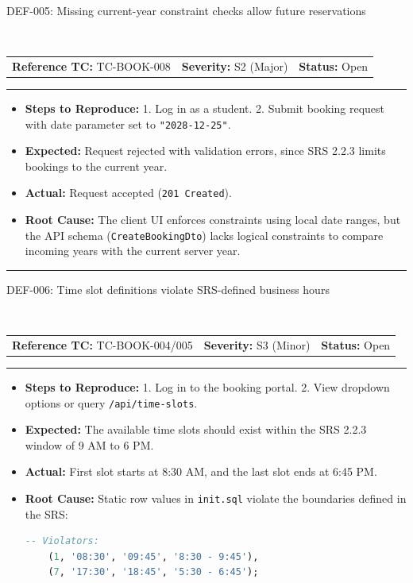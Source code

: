 \documentclass[11pt,a4paper]{article}
\makeatletter
\newcommand{\defectheader}[5]{%
    \needspace{6\baselineskip}
    \noindent\colorbox{primaryblue}{\parbox{\dimexpr\textwidth-2\fboxsep\relax}{
        \color{white}\bfseries\large\strut #1: #2
    }}
    \nopagebreak\\
    \noindent\begin{tabularx}{\textwidth}{@{}X X X@{}}
        \textbf{Reference TC:} #3 & \textbf{Severity:} #4 & \textbf{Status:} #5 \\
    \end{tabularx}
    \nopagebreak\vspace{0.1cm}
    \nopagebreak\hrule\vspace{0.2cm}
}
\makeatother
\begin{document}
\defectheader{DEF-005}{Missing current-year constraint checks allow future reservations}{TC-BOOK-008}{S2 (Major)}{Open}
\begin{itemize}[noitemsep,topsep=1pt,leftmargin=0.5cm]
    \item \textbf{Steps to Reproduce:} 
    1. Log in as a student. 2. Submit booking request with date parameter set to \texttt{"2028-12-25"}.
    \item \textbf{Expected:} Request rejected with validation errors, since SRS 2.2.3 limits bookings to the current year.
    \item \textbf{Actual:} Request accepted (\texttt{201 Created}).
    \item \textbf{Root Cause:} The client UI enforces constraints using local date ranges, but the API schema (\texttt{CreateBookingDto}) lacks logical constraints to compare incoming years with the current server year.
\end{itemize}

\vspace{0.4cm}\hrule\vspace{0.4cm}

\defectheader{DEF-006}{Time slot definitions violate SRS-defined business hours}{TC-BOOK-004/005}{S3 (Minor)}{Open}
\begin{itemize}[noitemsep,topsep=1pt,leftmargin=0.5cm]
    \item \textbf{Steps to Reproduce:} 
    1. Log in to the booking portal. 2. View dropdown options or query \texttt{/api/time-slots}.
    \item \textbf{Expected:} The available time slots should exist within the SRS 2.2.3 window of 9 AM to 6 PM.
    \item \textbf{Actual:} First slot starts at 8:30 AM, and the last slot ends at 6:45 PM.
    \item \textbf{Root Cause:} Static row values in \texttt{init.sql} violate the boundaries defined in the SRS:
    \begin{lstlisting}[language=SQL]
    -- Violators:
    (1, '08:30', '09:45', '8:30 - 9:45'),
    (7, '17:30', '18:45', '5:30 - 6:45');
    \end{lstlisting}
\end{itemize}

\newpage
\end{document}
